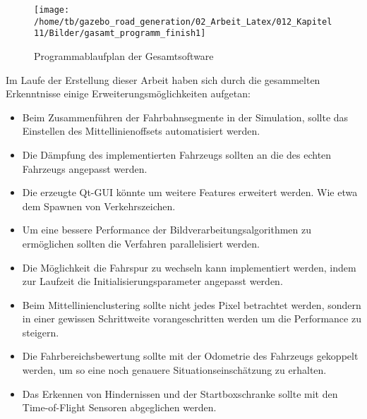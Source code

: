 \newpage

\begin{figure}[H]
\begin{center}
  \texttt{[image: /home/tb/gazebo\_road\_generation/02\_Arbeit\_Latex/012\_Kapitel11/Bilder/gasamt\_programm\_finish1]}%
  \caption[gs]%
           {\label{fig:gs}%
           Programmablaufplan der Gesamtsoftware}
\end{center}
\end{figure}

\newpage


Im Laufe der Erstellung dieser Arbeit haben sich durch die gesammelten Erkenntnisse einige
Erweiterungsm\"oglichkeiten aufgetan:



\begin{itemize}
\item Beim Zusammenf\"uhren der Fahrbahnsegmente in der Simulation, sollte das Einstellen des Mittellinienoffsets automatisiert werden.

\item Die D\"ampfung des implementierten Fahrzeugs sollten an die des echten Fahrzeugs angepasst werden.

\item Die erzeugte Qt-GUI k\"onnte um weitere Features erweitert werden. Wie etwa dem Spawnen von Verkehrszeichen. 

\item Um eine bessere Performance der Bildverarbeitungsalgorithmen zu erm\"oglichen sollten die Verfahren parallelisiert werden.

\item Die M\"oglichkeit die Fahrspur zu wechseln kann implementiert werden, indem zur Laufzeit die Initialisierungsparameter angepasst werden.

\item Beim Mittellinienclustering sollte nicht jedes Pixel betrachtet werden, sondern in einer gewissen Schrittweite vorangeschritten werden um die Performance zu steigern.

\item Die Fahrbereichsbewertung sollte mit der Odometrie des Fahrzeugs gekoppelt werden, um so eine noch genauere Situationseinsch\"atzung zu erhalten.

\item Das Erkennen von Hindernissen und der Startboxschranke sollte mit den Time-of-Flight Sensoren abgeglichen werden.


\end{itemize}
